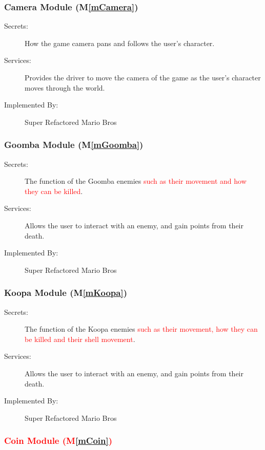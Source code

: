 \documentclass[12pt, titlepage]{article}
\newcommand{\mref}[1]{M\ref{#1}}
\begin{document}
\subsubsection{Camera Module (\mref{mCamera})}

\begin{description}
\item[Secrets:] How the game camera pans and follows the user's character.
\item[Services:] Provides the driver to move the camera of the game as the user's character moves through the world.
\item[Implemented By:] Super Refactored Mario Bros
\end{description}

\subsubsection{Goomba Module (\mref{mGoomba})}

\begin{description}
\item[Secrets:] The function of the Goomba enemies \textcolor{red}{such as their movement and how they can be killed}.
\item[Services:] Allows the user to interact with an enemy, and gain points from their death.
\item[Implemented By:] Super Refactored Mario Bros
\end{description}

\subsubsection{Koopa Module (\mref{mKoopa})}

\begin{description}
\item[Secrets:] The function of the Koopa enemies \textcolor{red}{such as their movement, how they can be killed and their shell movement}.
\item[Services:] Allows the user to interact with an enemy, and gain points from their death.
\item[Implemented By:] Super Refactored Mario Bros
\end{description}

\subsubsection{\textcolor{red}{Coin Module (\mref{mCoin})}}
\end{document}
